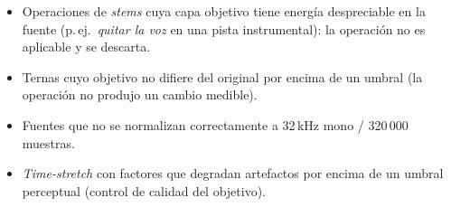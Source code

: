 \begin{itemize}
  \item Operaciones de \textit{stems} cuya capa objetivo tiene energía
        despreciable en la fuente (p.\,ej.\ \textit{quitar la voz} en una pista
        instrumental): la operación no es aplicable y se descarta.
  \item Ternas cuyo objetivo no difiere del original por encima de un umbral
        (la operación no produjo un cambio medible).
  \item Fuentes que no se normalizan correctamente a 32\,kHz mono / 320\,000
        muestras.
  \item \textit{Time-stretch} con factores que degradan artefactos por encima de
        un umbral perceptual (control de calidad del objetivo).
\end{itemize}


